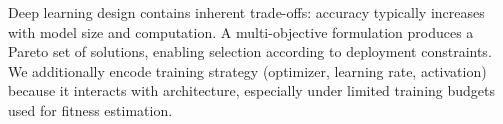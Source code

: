 Deep learning design contains inherent trade-offs: accuracy typically increases with model size and computation.
A multi-objective formulation produces a Pareto set of solutions, enabling selection according to deployment constraints.
We additionally encode training strategy (optimizer, learning rate, activation) because it interacts with architecture,
especially under limited training budgets used for fitness estimation.
